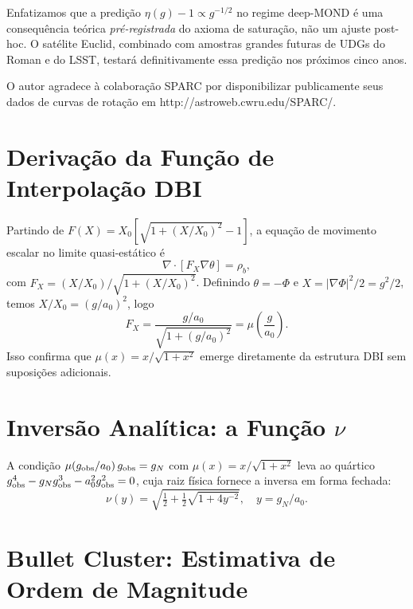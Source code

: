 \documentclass[aps,prd,twocolumn,showpacs,superscriptaddress]{revtex4-2}
\newcommand{\aO}{a_0}
\newcommand{\Xzero}{X_0}
\begin{document}
Enfatizamos que a predição $\eta(g) - 1 \propto g^{-1/2}$ no
regime deep-MOND é uma consequência teórica \emph{pré-registrada}
do axioma de saturação, não um ajuste post-hoc.
O satélite Euclid, combinado com amostras grandes futuras de UDGs
do Roman e do LSST, testará definitivamente essa predição nos
próximos cinco anos.

\begin{acknowledgments}
O autor agradece à colaboração SPARC por disponibilizar
publicamente seus dados de curvas de rotação em
http://astroweb.cwru.edu/SPARC/.
\end{acknowledgments}

\appendix

\section{Derivação da Função de Interpolação DBI}
\label{app:DBI}

Partindo de $F(X) = \Xzero[\sqrt{1+(X/\Xzero)^2}-1]$,
a equação de movimento escalar no limite quasi-estático é
\begin{equation}
  \nabla\cdot[F_X\nabla\theta] = \rho_b,
\end{equation}
com $F_X = (X/\Xzero)/\sqrt{1+(X/\Xzero)^2}$.
Definindo $\theta = -\Phi$ e $X = |\nabla\Phi|^2/2 = g^2/2$,
temos $X/\Xzero = (g/\aO)^2$, logo
\begin{equation}
  F_X = \frac{g/\aO}{\sqrt{1+(g/\aO)^2}} = \mu\!\left(\frac{g}{\aO}\right).
\end{equation}
Isso confirma que $\mu(x) = x/\sqrt{1+x^2}$ emerge diretamente
da estrutura DBI sem suposições adicionais.

\section{Inversão Analítica: a Função $\nu$}
\label{app:nu}

A condição $\mu(g_{\rm obs}/\aO)\,g_{\rm obs} = g_N$
com $\mu(x) = x/\sqrt{1+x^2}$ leva ao quártico
$g_{\rm obs}^4 - g_N g_{\rm obs}^3 - \aO^2 g_{\rm obs}^2 = 0$,
cuja raiz física fornece a inversa em forma fechada:
\begin{equation}
  \nu(y) = \sqrt{\tfrac{1}{2} + \tfrac{1}{2}\sqrt{1+4y^{-2}}},
  \quad y = g_N/\aO.
\end{equation}

\section{Bullet Cluster: Estimativa de Ordem de Magnitude}
\label{app:bullet}
\end{document}
